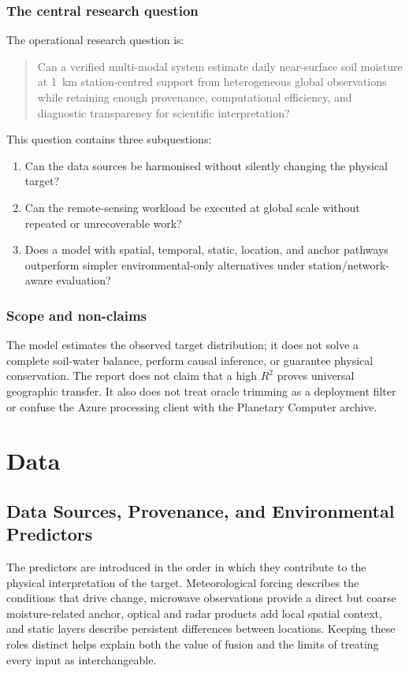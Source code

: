 \documentclass[12pt,a4paper]{report}
\begin{document}
\subsection{The central research question}
The operational research question is:
\begin{quote}
Can a verified multi-modal system estimate daily near-surface soil moisture at
1~km station-centred support from heterogeneous global observations while
retaining enough provenance, computational efficiency, and diagnostic
transparency for scientific interpretation?
\end{quote}

This question contains three subquestions:
\begin{enumerate}
    \item Can the data sources be harmonised without silently changing the
    physical target?
    \item Can the remote-sensing workload be executed at global scale without
    repeated or unrecoverable work?
    \item Does a model with spatial, temporal, static, location, and anchor
    pathways outperform simpler environmental-only alternatives under
    station/network-aware evaluation?
\end{enumerate}

\subsection{Scope and non-claims}
The model estimates the observed target distribution; it does not solve a
complete soil-water balance, perform causal inference, or guarantee physical
conservation. The report does not claim that a high $R^2$ proves universal
geographic transfer. It also does not treat oracle trimming as a deployment
filter or confuse the Azure processing client with the Planetary Computer
archive.

\chapter{Data}
\section{Data Sources, Provenance, and Environmental Predictors}

The predictors are introduced in the order in which they contribute to the
physical interpretation of the target. Meteorological forcing describes the
conditions that drive change, microwave observations provide a direct but
coarse moisture-related anchor, optical and radar products add local spatial
context, and static layers describe persistent differences between locations.
Keeping these roles distinct helps explain both the value of fusion and the
limits of treating every input as interchangeable.
\end{document}
